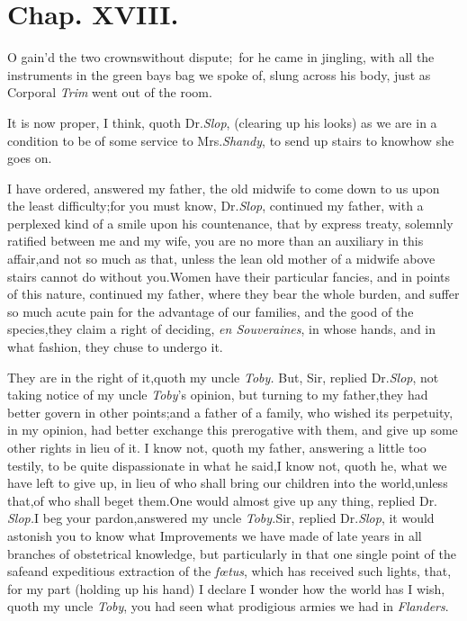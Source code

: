 \documentclass{article}
\begin{document}
\bigskip

\section{Chap. XVIII.}

\lettrine{O}{} gain’d the two crowns\break without
dispute;\ for he came in jingling, with all the instruments in
the green bays bag we spoke of, slung across his body, just as
Corporal \textit{Trim} went out of the room.

It is now proper, I think, quoth Dr.\@ \textit{Slop}, (clearing up
his looks) as we are in a condition to be of some service to
Mrs.\@ \textit{Shandy}, to send up stairs to know\break how she goes on.

\newpage
I have ordered, answered my father, the old midwife to come down
to us upon the least difficulty;\tsh for you\break
must know, Dr.\@ \textit{Slop}, continued my father, with a perplexed kind of a
smile upon his countenance, that by express treaty, solemnly
ratified between me and my wife, you are no more than an
auxiliary in this affair,\tsk and not so much as that,\tsk
unless the lean old mother of a midwife above stairs cannot do
without you.\tsh Women have their particular fancies, and in
points of this nature, continued my father, where they bear the
whole burden, and suffer so much acute pain for the advantage of
our families, and the good of the species,\tsk they claim a
right of deciding, \textit{en Souveraines}, in whose hands, and
in
what fashion, they chuse to undergo it.

\newpage
They are in the right of it,\tsh quoth\break
my uncle \textit{Toby.} But, Sir, replied Dr.\@ \textit{Slop}, not taking notice of
my uncle \textit{Toby}’s opinion, but turning to my
father,\tsk they had better govern in other
points;\tsh and a father of a family, who wished its
perpetuity, in my opinion, had better exchange this prerogative
with them, and give up some other rights in lieu of
it.\tsh\break
I know not, quoth my father, answering a little too testily, to
be quite dispassionate in what he said,\tsk I know not, quoth
he, what we have left to give up, in lieu of who shall bring our
children into the world,\tsk unless that,\tsk of who shall beget
them.\tsh One would almost give up any thing, replied Dr.\@
\textit{Slop.}\tsk I beg your pardon,\tsh answered my uncle
\textit{Toby.}\break\tsk Sir, replied Dr.\@ \textit{Slop}, it
would astonish you to know what Improvements we have made of
late years in all branches\pb
of obstetrical knowledge, but partic\-u\-larly in that
one single point of the safe\break and expeditious extraction of the
\textit{fœtus},\break
\tsh which has received such lights, that, 
for my part (holding up his hand) I 
declare I wonder how the world has\tsh\break
I wish, quoth my uncle \textit{Toby}, you had
seen what prodigious armies we had in \textit{Flanders}.
\end{document}
